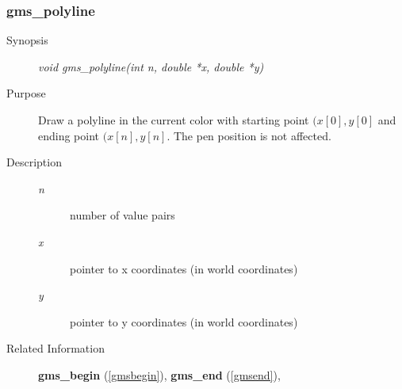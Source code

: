 \subsubsection{gms\_polyline\label{gmspolyline}}
\begin{description}
\item[Synopsis]\mbox{}


{\em void    gms\_polyline(int n, double *x, double *y)\/}
\item[Purpose]\mbox{}


Draw a polyline in the  current color with starting point $(x[0],y[0]$ and
ending point $(x[n],y[n]$.
The pen position is not affected.
\item[Description]\mbox{}


\begin{description}
\item[{\em n\/}]\mbox{}

 number of value pairs
\item[{\em x\/}]\mbox{}

 pointer to x coordinates (in world coordinates)
\item[{\em y\/}]\mbox{}

 pointer to y coordinates (in world coordinates)
\end{description}

\item[Related Information]\mbox{}


{\bf gms\_begin} (\ref{gmsbegin}), 
{\bf gms\_end} (\ref{gmsend}), 
\end{description}


\newpage




